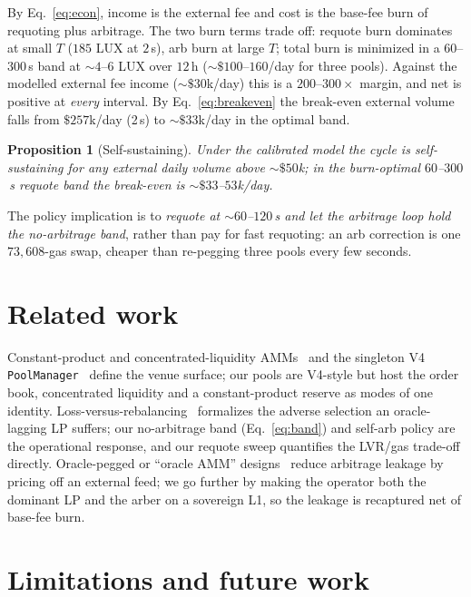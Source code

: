 \documentclass[11pt,a4paper]{article}
\newtheorem{proposition}{Proposition}[section]
\begin{document}
By Eq.~\eqref{eq:econ}, income is the external fee and cost is the base-fee burn of
requoting plus arbitrage. The two burn terms trade off: requote burn dominates at small
$T$ ($185$ LUX at $2$\,s), arb burn at large $T$; total burn is minimized in a
$60$--$300$\,s band at $\sim\!4$--$6$ LUX over $12$\,h ($\sim\!\$100$--$160$/day for three
pools). Against the modelled external fee income ($\sim\!\$30$k/day) this is a
$200$--$300\times$ margin, and net is positive at \emph{every} interval. By
Eq.~\eqref{eq:breakeven} the break-even external volume falls from $\$257$k/day (2\,s) to
$\sim\!\$33$k/day in the optimal band.

\begin{proposition}[Self-sustaining]\label{prop:sustain}
Under the calibrated model the cycle is self-sustaining for any external daily volume
above $\sim\!\$50$k; in the burn-optimal $60$--$300$\,s requote band the break-even is
$\sim\!\$33$--$53$k/day.
\end{proposition}

\noindent The policy implication is to \emph{requote at $\sim\!60$--$120$\,s and let the
arbitrage loop hold the no-arbitrage band}, rather than pay for fast requoting: an arb
correction is one $73{,}608$-gas swap, cheaper than re-pegging three pools every few
seconds.

\section{Related work}

Constant-product and concentrated-liquidity AMMs~\cite{uniswapv2,uniswapv3} and the
singleton V4 \texttt{PoolManager}~\cite{uniswapv4} define the venue surface; our pools
are V4-style but host the order book, concentrated liquidity and a constant-product
reserve as modes of one identity. Loss-versus-rebalancing~\cite{lvr} formalizes the
adverse selection an oracle-lagging LP suffers; our no-arbitrage band
(Eq.~\eqref{eq:band}) and self-arb policy are the operational response, and our requote
sweep quantifies the LVR/gas trade-off directly. Oracle-pegged or ``oracle AMM''
designs~\cite{mev} reduce arbitrage leakage by pricing off an external feed; we go
further by making the operator both the dominant LP and the arber on a sovereign L1, so
the leakage is recaptured net of base-fee burn.

\section{Limitations and future work}
\end{document}
